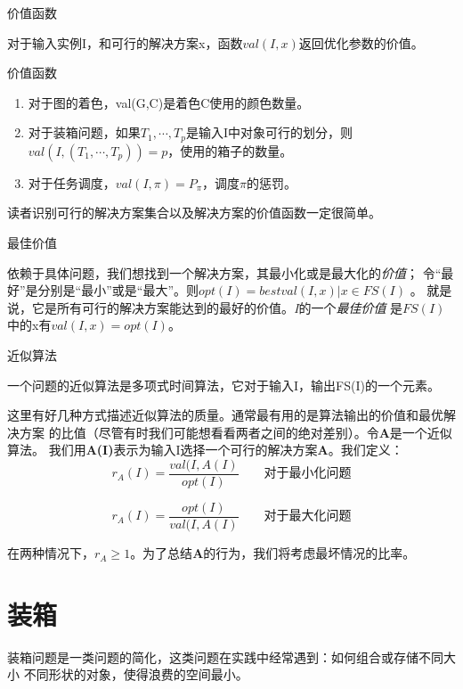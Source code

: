\begin{definition}
价值函数

对于输入实例I，和可行的解决方案x，函数$val(I,x)$返回优化参数的价值。
\end{definition}

\begin{example}
价值函数

\begin{enumerate}
\item 对于图的着色，val(G,C)是着色C使用的颜色数量。
\item 对于装箱问题，如果$T_1, \cdots,T_p$是输入I中对象可行的划分，则
        $val(I,(T_1, \cdots,T_p))=p$，使用的箱子的数量。
\item 对于任务调度，$val(I,\pi)=P_\pi$，调度$\pi$的惩罚。
\end{enumerate}
\end{example}

读者识别可行的解决方案集合以及解决方案的价值函数一定很简单。

\begin{definition}
最佳价值

依赖于具体问题，我们想找到一个解决方案，其最小化或是最大化的\emph{价值}；
令“最好”是分别是“最小”或是“最大”。则$opt(I)=best{val(I,x)|x \in FS(I)}$ 。
就是说，它是所有可行的解决方案能达到的最好的价值。\emph{I}的一个\emph{最佳价值}
是$FS(I)$中的x有$val(I,x)=opt(I)$。
\end{definition}

\begin{definition}
近似算法

一个问题的近似算法是多项式时间算法，它对于输入I，输出FS(I)的一个元素。
\end{definition}

这里有好几种方式描述近似算法的质量。通常最有用的是算法输出的价值和最优解决方案
的比值（尽管有时我们可能想看看两者之间的绝对差别）。令\textbf{A}是一个近似算法。
我们用\textbf{A(I)}表示为输入I选择一个可行的解决方案\textbf{A}。我们定义：
\begin{equation}
r_A(I)=\frac{val(I, A(I)}{opt(I)}  \qquad \mbox{对于最小化问题}
\end{equation}

\begin{equation}
r_A(I)=\frac{opt(I)}{val(I, A(I)}  \qquad \mbox{对于最大化问题}
\end{equation}

在两种情况下，$r_A \geq 1$。为了总结\textbf{A}的行为，我们将考虑最坏情况的比率。

\section{装箱}
装箱问题是一类问题的简化，这类问题在实践中经常遇到：如何组合或存储不同大小
不同形状的对象，使得浪费的空间最小。

